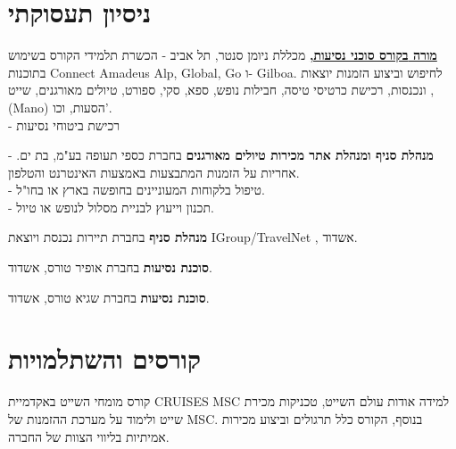 \section{ניסיון תעסוקתי}

{\href{https://bit.ly/385JmIG}{
	\textbf{מורה 
{בקורס סוכני נסיעות,}}}
מכללת ניומן סנטר, תל אביב}
{- הכשרת תלמידי הקורס בשימוש בתוכנות
Connect Amadeus Alp, Global, Go ו- Gilboa.
לחיפוש וביצוע הזמנות יוצאות ונכנסות, רכישת כרטיסי טיסה, חבילות נופש, ספא, סקי, ספורט, טיולים מאורגנים, שייט ,(Mano) הסעות, וכו'. \\
- רכישת ביטוחי נסיעות
}
{}

{\textbf{מנהלת סניף ומנהלת אתר מכירות טיולים מאורגנים }בחברת כספי תעופה בע"מ, בת ים.}
{
- אחריות על הזמנות המתבצעות באמצעות האינטרנט והטלפון.\\
- טיפול בלקוחות המעוניינים בחופשה בארץ או בחו"ל.\\
- תכנון וייעוץ לבניית מסלול לנופש או טיול.
}
{}

{\textbf{מנהלת סניף} בחברת תיירות נכנסת ויוצאת
	\setLTR IGroup/TravelNet \unsetLTR, אשדוד.}
{}
{}

{\textbf{סוכנת נסיעות} בחברת אופיר טורס, אשדוד.}
{}
{}

{\textbf{סוכנת נסיעות} בחברת שגיא טורס, אשדוד.}
{}
{}


	 

\section{קורסים והשתלמויות}

{קורס מומחי השייט באקדמיית CRUISES MSC}
{למידה אודות עולם השייט, טכניקות מכירת שייט ולימוד על מערכת ההזמנות של MSC.}
{בנוסף, הקורס כלל תרגולים וביצוע מכירות אמיתיות בליווי הצוות של החברה.}

